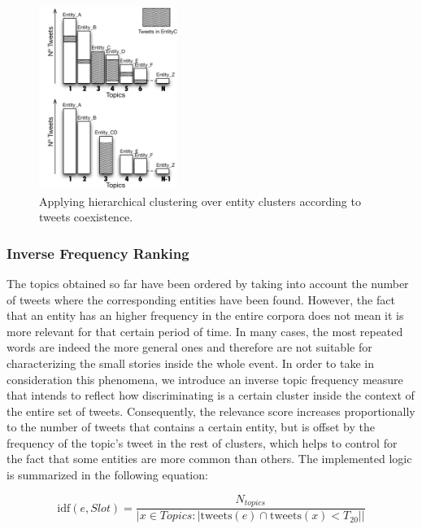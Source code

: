 \documentclass{sig-alternate}
\begin{document}
\begin{figure}[h!]
\centering
\includegraphics[width=0.4\textwidth]{figure/Hierarchical_Cluster.png}
\caption{Applying hierarchical clustering over entity clusters according to tweets coexistence.}
\label{fig:Hierarchical_Cluster}
\end{figure}

\subsubsection{Inverse Frequency Ranking}

The topics obtained so far have been ordered by taking into account the number of tweets where the corresponding entities have been found. However, the fact that an entity has an higher frequency in the entire corpora does not mean it is more relevant for that certain period of time. In many cases, the most repeated words are indeed the more general ones and therefore are not suitable for characterizing the small stories inside the whole event. In order to take in consideration this phenomena, we introduce an inverse topic frequency measure that intends to reflect how discriminating is a certain cluster inside the context of the entire set of tweets. 
Consequently, the relevance score increases proportionally to the number of tweets that contains a certain entity, but is offset by the frequency of the topic's tweet in the rest of clusters, which helps to control for the fact that some entities are more common than others. The implemented logic is summarized in the following equation:

\begin{equation}
\text{idf}(e, Slot) =\frac{N_{topics}}{\left | x\in Topics: \left | \text{tweets}(e)\cap \text{tweets}(x) < T_{20}\right |\right |}
\end{equation}
\end{document}
